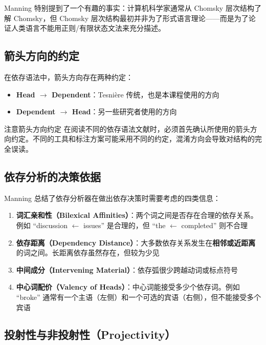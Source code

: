 \documentclass[a4paper]{article}
\begin{document}
Manning 特别提到了一个有趣的事实：计算机科学家通常从 Chomsky 层次结构了解 Chomsky，但 Chomsky 层次结构最初并非为了形式语言理论——而是为了论证人类语言不能用正则/有限状态文法来充分描述。

\subsection{箭头方向的约定}

在依存语法中，箭头方向存在两种约定：

\begin{itemize}
    \item \textbf{Head $\rightarrow$ Dependent}：Tesni\`ere 传统，也是本课程使用的方向
    \item \textbf{Dependent $\rightarrow$ Head}：另一些研究者使用的方向
\end{itemize}

\begin{warningbox}{注意箭头方向约定}
在阅读不同的依存语法文献时，必须首先确认所使用的箭头方向约定。不同的工具和标注方案可能采用不同的约定，混淆方向会导致对结构的完全误读。
\end{warningbox}

\subsection{依存分析的决策依据}

Manning 总结了依存分析器在做出依存决策时需要考虑的四类信息：

\begin{enumerate}
    \item \textbf{词汇亲和性（Bilexical Affinities）}：两个词之间是否存在合理的依存关系。例如 ``discussion $\leftarrow$ issues'' 是合理的，但 ``the $\leftarrow$ completed'' 则不合理
    \item \textbf{依存距离（Dependency Distance）}：大多数依存关系发生在\textbf{相邻或近距离}的词之间。长距离依存虽然存在，但较为少见
    \item \textbf{中间成分（Intervening Material）}：依存弧很少跨越动词或标点符号
    \item \textbf{中心词配价（Valency of Heads）}：中心词能接受多少个依存词。例如 ``broke'' 通常有一个主语（左侧）和一个可选的宾语（右侧），但不能接受多个宾语
\end{enumerate}





\subsection{投射性与非投射性（Projectivity）}
\end{document}
